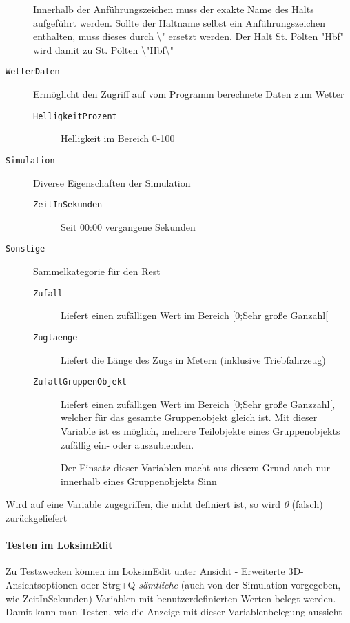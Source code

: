 \begin{description}
Innerhalb der Anführungszeichen muss der exakte Name des Halts
aufgeführt werden. Sollte der Haltname selbst ein Anführungszeichen
enthalten, muss dieses durch \textbackslash{}" ersetzt werden. Der Halt
St. Pölten "Hbf" wird damit zu St. Pölten
\textbackslash{}"Hbf\textbackslash{}"
\item[\texttt{WetterDaten}]
Ermöglicht den Zugriff auf vom Programm berechnete Daten zum Wetter

\begin{description}
\item[\texttt{HelligkeitProzent}]
Helligkeit im Bereich 0-100
\end{description}

\item[\texttt{Simulation}]
Diverse Eigenschaften der Simulation
\begin{description}
\item[\texttt{ZeitInSekunden}]
Seit 00:00 vergangene Sekunden
\end{description}

\item[\texttt{Sonstige}]
Sammelkategorie für den Rest

\begin{description}
\item[\texttt{Zufall}]
Liefert einen zufälligen Wert im Bereich {[}0;Sehr große Ganzahl{[}
\item[\texttt{Zuglaenge}]
Liefert die Länge des Zugs in Metern (inklusive Triebfahrzeug)
\item[\texttt{ZufallGruppenObjekt}]
Liefert einen zufälligen Wert im Bereich {[}0;Sehr große Ganzzahl{[},
welcher für das gesamte Gruppenobjekt gleich ist. Mit dieser Variable
ist es möglich, mehrere Teilobjekte eines Gruppenobjekts zufällig ein-
oder auszublenden.

Der Einsatz dieser Variablen macht aus diesem Grund auch nur innerhalb
eines Gruppenobjekts Sinn
\end{description}
\end{description}

Wird auf eine Variable zugegriffen, die nicht definiert ist, so wird
\emph{0} (falsch) zurückgeliefert

\paragraph{Testen im LoksimEdit}

Zu Testzwecken können im LoksimEdit unter Ansicht - Erweiterte
3D-Ansichtsoptionen oder Strg+Q \emph{sämtliche} (auch von der Simulation
vorgegeben, wie ZeitInSekunden) Variablen mit benutzerdefinierten Werten
belegt werden. Damit kann man Testen, wie die Anzeige mit dieser
Variablenbelegung aussieht

